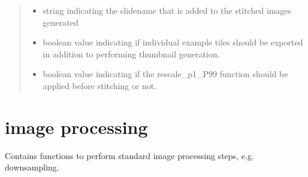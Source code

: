 \documentclass[a4paper,10pt,english,openany,oneside]{sphinxmanual}
\begin{document}
\begin{fulllineitems}
\begin{quote}
\begin{description}
\begin{itemize}
\item {} 
\sphinxAtStartPar
{} \textendash{} string indicating the slidename that is added to the stitched images generated

\item {} 
\sphinxAtStartPar
{} \textendash{} boolean value indicating if individual example tiles should be exported in addition to performing thumbnail generation.

\item {} 
\sphinxAtStartPar
{} \textendash{} boolean value indicating if the rescale\_p1\_P99 function should be applied before stitching or not.

\end{itemize}

\end{description}\end{quote}

\end{fulllineitems}

\label{\detokenize{pages/modules:module-vipertools.image_processing}}

\section{image processing}
\label{\detokenize{pages/modules:image-processing}}
\sphinxAtStartPar
Contains functions to perform standard image processing steps, e.g. downsampling.
\end{document}
